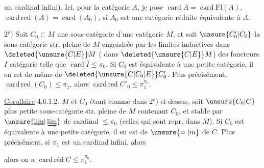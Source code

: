 un cardinal infini). Ici, pour la catégorie  $A$, je pose $\operatorname{card}A=\operatorname{card}\mathrm{Fl}(A)$,  $\operatorname{card\,red}(A)=\operatorname{card}(A_0)$, si $A_0$ est une catégorie réduite équivalente à $A$.

2°) Soit $C_0\subset M$ une sous-catégorie  d'une catégorie $M$,  et soit $\unsure{C'_0|C_0}$ la sous-catégorie str. pleine de $M$  engendrée par les limites inductives  dans $\deleted{\unsure{C|E}}M$ ( dans $\deleted{\unsure{C|E}}M$) des foncteurs
 $I$ catégorie telle que $\operatorname{card}\bar I\leq\pi_0$. Si $C_0$ est équivalente à une petite catégorie, il en est de même de $\deleted{\unsure{C|C_0|E}}C'_0$. Plus précisément, $\operatorname{card\,red}(C_0)\leq\pi_1$,  alors  $\operatorname{card\,red}C'_0\leq\pi_1^{\pi_0}$.

 \uline{Corollaire} 4.6.1.2. $M$ et $C_0$ étant comme dans 2°) ci-dessus, soit $\unsure{C_0|C}$  plus petite sous-catégorie str. pleine de $M$  contenant $C_0$, et stable par $\unsure{\underline{\lim}|\varinjlim}$ de cardinal $\leq\pi_0$ (celles qui sont repr. dans $M$). Si $C_0$ est équivalente à une petite catégorie, il en est de $\unsure{=|\bar m}$ de $C$. Plus précisément, si $\pi_1$ est un cardinal infini,  alors

alors on a $\operatorname{card\,réd}C\leq\pi_1^{\pi_0}$.

